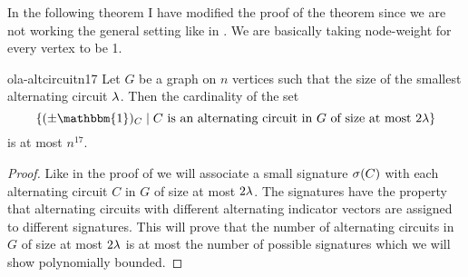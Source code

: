 In the following theorem I have modified the proof of the theorem since we are not working the general setting like in \cite{SvenssonTarnawski_2017_TMP_CONF}. We are basically taking node-weight for every vertex to be 1.
\begin{Theorem}{\cite[Lemma 5.4]{SvenssonTarnawski_2017_TMP_CONF}}{ola-altcircuitn17}
	Let $G$ be a graph on $n$ vertices such that the size of the smallest alternating circuit $\lambda$. Then the cardinality of the set $$\{(\pm \mathbbm{1})_C\mid C\text{ is an alternating circuit in $G$ of size at most $2\lm$}\}$$is at most $n^{17}$.
\end{Theorem}
\begin{proof}
	Like in the proof of  we will associate a small signature $\sigma(C)$ with each alternating circuit $C$ in $G$ of size at most $2\lambda$. The signatures have the property that alternating circuits with different alternating indicator vectors are assigned to different signatures. This will prove that the number of alternating circuits in $G$ of size at most $2\lambda$ is  at most the number of possible signatures which we will show polynomially bounded.


\end{proof}
